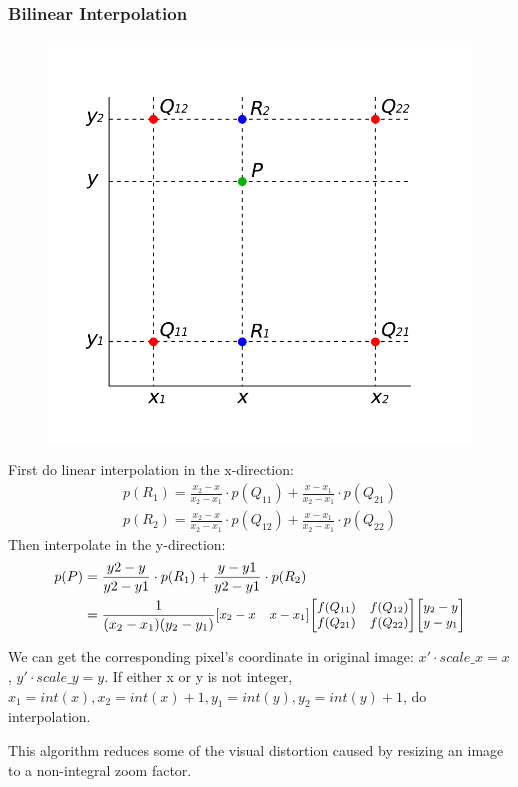 \documentclass[journal,conference]{IEEEtran}
\begin{document}
\subsubsection{Bilinear Interpolation}
\begin{figure}[h]
	\centering
	\includegraphics[width=0.6\linewidth]{fig/1.png}
	\label{fig:Bilinear Interpolation}
\end{figure}
\par First do linear interpolation in the x-direction:
\begin{align*}
p(R_1) = \frac{x_2-x}{x_2-x_1}\cdot p(Q_{11})+\frac{x-x_1}{x_2-x_1}\cdot p(Q_{21})\\
p(R_2) = \frac{x_2-x}{x_2-x_1}\cdot p(Q_{12})+\frac{x-x_1}{x_2-x_1}\cdot p(Q_{22})
\end{align*}
Then interpolate in the y-direction:
\begin{align*}
p(P) &= \frac{y2-y}{y2-y1}\cdot p(R_1)+\frac{y-y1}{y2-y1}\cdot p(R_2)\\ &=\small{\frac {1}{(x_{2}-x_{1})(y_{2}-y_{1})}}{\begin{bmatrix}x_{2}-x&x-x_{1}\end{bmatrix}}{\begin{bmatrix}f(Q_{11})&f(Q_{12})\\f(Q_{21})&f(Q_{22})\end{bmatrix}}{\begin{bmatrix}y_{2}-y\\y-y_{1}\end{bmatrix}}
\end{align*}
\par We can get the corresponding pixel's coordinate in original image: $x'\cdot scale\_x=x$, $y'\cdot scale\_y=y$. If either x or y is not integer, $x_1=int(x),x_2=int(x)+1,y_1=int(y), y_2=int(y)+1$, do interpolation.
\par This algorithm reduces some of the visual distortion caused by resizing an image to a non-integral zoom factor.
~\\
\end{document}
